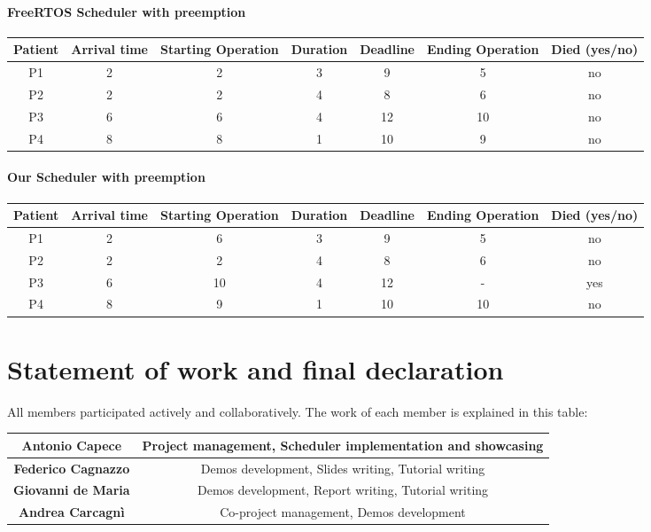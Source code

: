 \documentclass[a4paper, 10pt, oneside]{article} %
\begin{document}
\paragraph{FreeRTOS Scheduler with preemption}

\begin{center}
    \begin{tabular}{c|c|c|c|c|c|c}
   \textbf{Patient} & \textbf{Arrival time} & \textbf{Starting Operation} & \textbf{Duration} & \textbf{Deadline} & \textbf{Ending Operation} & \textbf{Died (yes/no)}\\
    \hline
         P1 & 2 & 2 & 3 & 9 & 5 & no \\
         P2 & 2 & 2 & 4 & 8 & 6 & no \\
         P3 & 6 & 6 & 4 & 12 & 10 & no \\
         P4 & 8 & 8 & 1 & 10 & 9 & no \\
    \end{tabular}
\end{center}


\paragraph{Our Scheduler with preemption}

\begin{center}
    \begin{tabular}{c|c|c|c|c|c|c}
   \textbf{Patient} & \textbf{Arrival time} & \textbf{Starting Operation} & \textbf{Duration} & \textbf{Deadline} & \textbf{Ending Operation} & \textbf{Died (yes/no)}\\
    \hline
         P1 & 2 & 6 & 3 & 9 & 5 & no  \\
         P2 & 2 & 2 & 4 & 8 & 6 & no  \\
         P3 & 6 & 10 & 4 & 12 & - & yes \\
         P4 & 8 & 9 & 1 & 10 & 10 & no \\
    \end{tabular}
\end{center}


\section{Statement of work and final declaration}

All members participated actively and collaboratively. The work of each member is explained in this table:\\


\begin{tabular}{|c|c|}
    \hline
    \textbf{Antonio Capece} & Project management, Scheduler implementation and showcasing \\ \hline
    \textbf{Federico Cagnazzo} & Demos development, Slides writing, Tutorial writing \\ \hline
    \textbf{Giovanni de Maria} & Demos development, Report writing, Tutorial writing \\ \hline
    \textbf{Andrea Carcagnì} & Co-project management, Demos development \\ \hline
\end{tabular}
\end{document}
